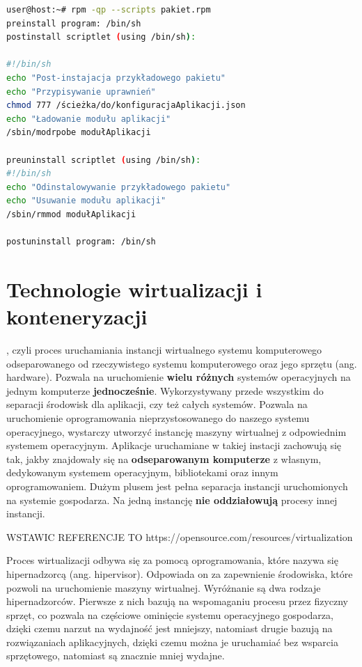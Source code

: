 \begin{lstlisting}[label={lis:skryptRPM}, language=bash, caption={Skrypty pakietu RPM}]
user@host:~# rpm -qp --scripts pakiet.rpm
preinstall program: /bin/sh
postinstall scriptlet (using /bin/sh):

#!/bin/sh
echo "Post-instajacja przykładowego pakietu"
echo "Przypisywanie uprawnień"
chmod 777 /ścieżka/do/konfiguracjaAplikacji.json
echo "Ładowanie modułu aplikacji"
/sbin/modrpobe modułAplikacji

preuninstall scriptlet (using /bin/sh):
#!/bin/sh
echo "Odinstalowywanie przykładowego pakietu"
echo "Usuwanie modułu aplikacji"
/sbin/rmmod modułAplikacji

postuninstall program: /bin/sh
\end{lstlisting}

\section{Technologie wirtualizacji i konteneryzacji}

, czyli proces uruchamiania instancji wirtualnego systemu komputerowego odseparowanego od rzeczywistego systemu komputerowego oraz jego sprzętu (ang. hardware). Pozwala na uruchomienie \textbf{wielu różnych} systemów operacyjnych na jednym komputerze \textbf{jednocześnie}. Wykorzystywany przede wszystkim do separacji środowisk dla aplikacji, czy też całych systemów. Pozwala na uruchomienie oprogramowania nieprzystosowanego do naszego systemu operacyjnego, wystarczy utworzyć instancję maszyny wirtualnej z odpowiednim systemem operacyjnym. Aplikacje uruchamiane w takiej instacji zachowują się tak, jakby znajdowały się na \textbf{odseparowanym komputerze} z własnym, dedykowanym systemem operacyjnym, bibliotekami oraz innym oprogramowaniem. Dużym plusem jest pełna separacja instancji uruchomionych na systemie gospodarza. Na jedną instancję \textbf{nie oddziałowują} procesy innej instancji.\par WSTAWIC REFERENCJE TO https://opensource.com/resources/virtualization

Proces wirtualizacji odbywa się za pomocą oprogramowania, które nazywa się hipernadzorcą (ang. hipervisor). Odpowiada on za zapewnienie środowiska, które pozwoli na uruchomienie maszyny wirtualnej. Wyróżnanie są dwa rodzaje hipernadzorców. Pierwsze z nich bazują na wspomaganiu procesu przez fizyczny sprzęt, co pozwala na częściowe ominięcie systemu operacyjnego gospodarza, dzięki czemu narzut na wydajność jest mniejszy, natomiast drugie bazują na rozwiązaniach aplikacyjnych, dzięki czemu można je uruchamiać bez wsparcia sprzętowego, natomiast są znacznie mniej wydajne.

